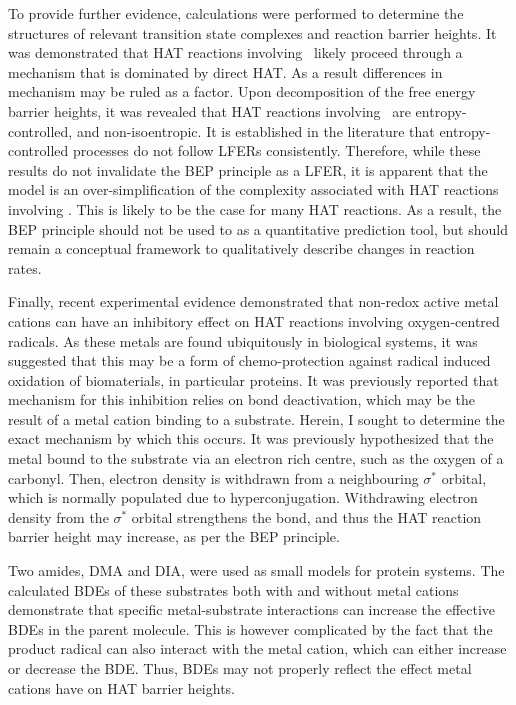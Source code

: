 \begin{doublespace}
To provide further evidence, calculations were performed to determine the
structures of relevant transition state complexes and reaction barrier heights.
It was demonstrated that HAT reactions involving \cumo\ likely proceed through a
mechanism that is dominated by direct HAT. As a result differences in mechanism
may be ruled as a factor. Upon decomposition of the free energy barrier heights,
it was revealed that HAT reactions involving \cumo\ are entropy-controlled, and
non-isoentropic. It is established in the literature that entropy-controlled
processes do not follow LFERs consistently.\cite{Exner1973} Therefore, while
these results do not invalidate the BEP principle as a LFER, it is apparent that
the model is an over-simplification of the complexity associated with HAT
reactions involving \cumo. This is likely to be the case for many HAT reactions.
As a result, the BEP principle should not be used to as a quantitative
prediction tool, but should remain a conceptual framework to qualitatively
describe changes in reaction rates.

Finally, recent experimental evidence demonstrated that non-redox active metal
cations can have an inhibitory effect on HAT reactions involving oxygen-centred
radicals. As these metals are found ubiquitously in biological systems, it was
suggested that this may be a form of chemo-protection against radical induced
oxidation of biomaterials, in particular proteins. It was previously reported
that mechanism for this inhibition relies on  bond deactivation, which
may be the result of a metal cation binding to a substrate. Herein, I sought to
determine the exact mechanism by which this occurs. It was previously
hypothesized that the metal bound to the substrate via an electron rich centre,
such as the oxygen of a carbonyl. Then, electron density is withdrawn from a
neighbouring  $\sigma^*$ orbital, which is normally populated due to
hyperconjugation. Withdrawing electron density from the  $\sigma^*$
orbital strengthens the bond, and thus the HAT reaction barrier height may
increase, as per the BEP principle.

Two amides, DMA and DIA, were used as small models for protein systems. The
calculated  BDEs of these substrates both with and without metal cations
demonstrate that specific metal-substrate interactions can increase the
effective  BDEs in the parent molecule. This is however complicated by
the fact that the product radical can also interact with the metal cation, which
can either increase or decrease the BDE. Thus, BDEs may not properly reflect the
effect metal cations have on HAT barrier heights.


\end{doublespace}
